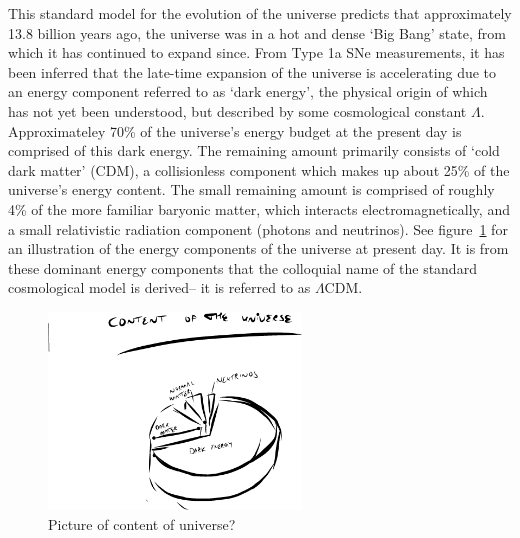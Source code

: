 This standard model for the evolution of the universe predicts that approximately 13.8 billion years ago, the universe was in a hot and dense `Big Bang' state, from which it has continued to expand since. From Type 1a SNe measurements, it has been inferred that the late-time expansion of the universe is accelerating due to an energy component referred to as `dark energy', the physical origin of which has not yet been understood, but described by some cosmological constant $\Lambda$. Approximateley 70\% of the universe's energy budget at the present day is comprised of this dark energy. The remaining amount primarily consists of `cold dark matter' (CDM), a collisionless component which makes up about 25\% of the universe's energy content. The small remaining amount is comprised of roughly 4\% of the more familiar baryonic matter, which interacts electromagnetically, and a small relativistic radiation component (photons and neutrinos). See figure~\ref{fig:contentuniverse} for an illustration of the energy components of the universe at present day. It is from these dominant energy components that the colloquial name of the standard cosmological model is derived-- it is referred to as $\Lambda$CDM.
\begin{figure}[ht]
	\centering
	\includegraphics[width=0.6\textwidth]{fig/placeholder_universecontent.png}
	\caption{Picture of content of universe?}
	\label{fig:contentuniverse}
\end{figure}

